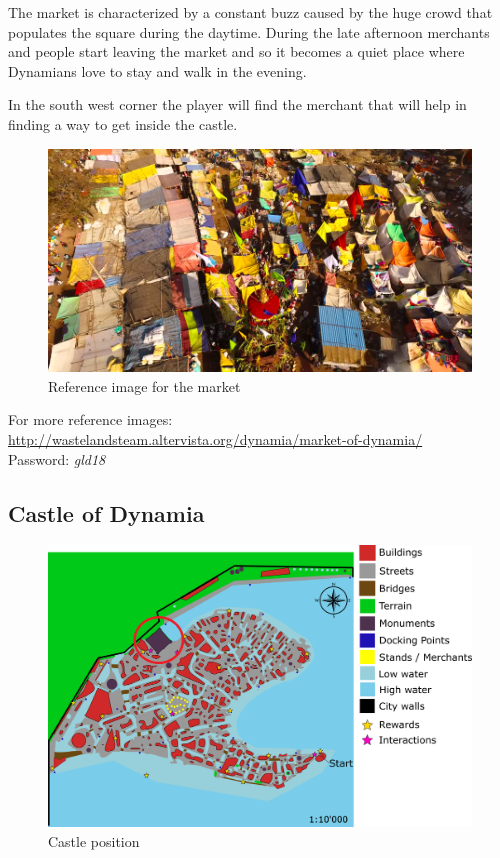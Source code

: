 The market is characterized by a constant buzz caused by the huge crowd that populates  the square during the daytime. During the late afternoon merchants and people start leaving the market and so it becomes a quiet place where Dynamians love to stay and walk in the evening.

In the south west corner the player will find the merchant that will help in finding a way to get inside the castle.
 
\begin{figure}[H]
  \centering
  \includegraphics[width=\textwidth]{Images/Landmarks/market}
  \caption{Reference image for the market}
\end{figure}

For more reference images: \url{http://wastelandsteam.altervista.org/dynamia/market-of-dynamia/}\\
Password: \textit{gld18}

\subsection{Castle of Dynamia}
\begin{figure}[H]
  \centering
  \includegraphics[width=\textwidth]{Images/Maps/dynamia_castleOfDynamia}
  \caption{Castle position}
\end{figure}

